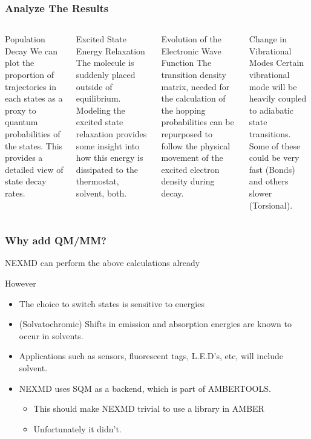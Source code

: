 \documentclass{beamer}
\begin{document}
\begin{frame}
  \frametitle{Analyze The Results}
 \begin{columns}[c]
\begin{block}{Population Decay}
We can plot the proportion of trajectories in each states as a proxy to quantum
probabilities of the states. This provides a detailed view of state decay rates. 
\end{block}
\begin{block}{Excited State Energy Relaxation}
The molecule is suddenly placed outside of equilibrium. Modeling the excited
state relaxation provides some insight into how this energy is dissipated to the
thermostat, solvent, both.
\end{block}
\begin{block}{Evolution of the Electronic Wave Function}
The transition density matrix, needed for the calculation of the hopping
probabilities can be repurposed to follow the physical movement of the excited electron density during decay.
\end{block}
\begin{block}{Change in Vibrational Modes}
  Certain vibrational mode will be heavily coupled to adiabatic state
  transitions. Some of these could be very fast (Bonds) and others slower (Torsional).
\end{block}

 \end{columns} 
\end{frame}

\begin{frame}
  \frametitle{Why add QM/MM?}
  NEXMD can perform the above calculations already
\begin{block}{However}
  \begin{itemize}
    \item The choice to switch states is sensitive to energies
    \item (Solvatochromic) Shifts in emission and absorption energies are known to
    occur in solvents.
    \item Applications such as sensors, fluorescent tags, L.E.D's, etc, will include solvent.
    \item NEXMD uses SQM as a backend, which is part of AMBERTOOLS.
    \begin{itemize}
      \item This should make NEXMD trivial to use a library in AMBER
      \item Unfortunately it didn't.
    \end{itemize}
  \end{itemize}
\end{block}
\end{frame}
\end{document}
